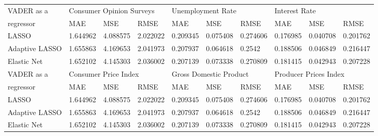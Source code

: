 \begin{table}[]
\begin{adjustbox}{max width=\textwidth}
\begin{tabular}{llllllllll}
VADER as   a   & \multicolumn{3}{l}{Consumer Opinion   Surveys} & \multicolumn{3}{l}{Unemployment Rate}      & \multicolumn{3}{l}{Interest Rate}         \\
regressor      & MAE            & MSE           & RMSE          & MAE           & MSE          & RMSE        & MAE          & MSE          & RMSE        \\
LASSO          & 1.644962       & 4.088575      & 2.022022      & 0.209345      & 0.075408     & 0.274606    & 0.176985     & 0.040708     & 0.201762    \\
Adaptive LASSO & 1.655863       & 4.169653      & 2.041973      & 0.207937      & 0.064618     & 0.2542      & 0.188506     & 0.046849     & 0.216447    \\
Elastic Net    & 1.652102       & 4.145303      & 2.036002      & 0.207139      & 0.073338     & 0.270809    & 0.181415     & 0.042943     & 0.207228    \\
VADER as   a   & \multicolumn{3}{l}{Consumer Price Index}       & \multicolumn{3}{l}{Gross Domestic Product} & \multicolumn{3}{l}{Producer Prices Index} \\
regressor      & MAE            & MSE           & RMSE          & MAE           & MSE          & RMSE        & MAE          & MSE          & RMSE        \\
LASSO          & 1.644962       & 4.088575      & 2.022022      & 0.209345      & 0.075408     & 0.274606    & 0.176985     & 0.040708     & 0.201762    \\
Adaptive LASSO & 1.655863       & 4.169653      & 2.041973      & 0.207937      & 0.064618     & 0.2542      & 0.188506     & 0.046849     & 0.216447    \\
Elastic Net    & 1.652102       & 4.145303      & 2.036002      & 0.207139      & 0.073338     & 0.270809    & 0.181415     & 0.042943     & 0.207228   
\end{tabular}
\end{adjustbox}
\end{table}


\newpage



